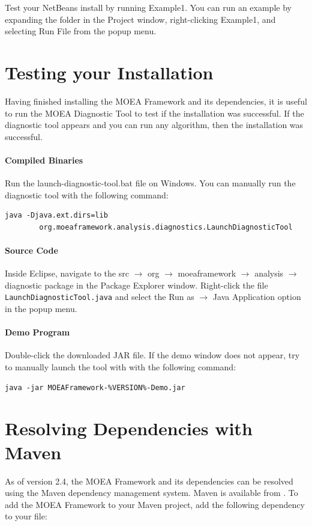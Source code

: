 Test your NetBeans install by running Example1.  You can run an example by expanding the  folder in the Project window, right-clicking Example1, and selecting Run File from the popup menu.

\section{Testing your Installation}
Having finished installing the MOEA Framework and its dependencies, it is useful to run the MOEA Diagnostic Tool to test if the installation was successful.  If the diagnostic tool appears and you can run any algorithm, then the installation was successful.

\paragraph{Compiled Binaries}
Run the launch-diagnostic-tool.bat file on Windows.  You can manually run the diagnostic tool with the following command:

\begin{lstlisting}[language=Plaintext]
java -Djava.ext.dirs=lib
		org.moeaframework.analysis.diagnostics.LaunchDiagnosticTool
\end{lstlisting}

\paragraph{Source Code}
Inside Eclipse, navigate to the src $\rightarrow$ org $\rightarrow$ moeaframework $\rightarrow$ analysis $\rightarrow$ diagnostic package in the Package Explorer window.  Right-click the file \texttt{LaunchDiagnosticTool.java} and select the Run as $\rightarrow$ Java Application option in the popup menu.

\paragraph{Demo Program}
Double-click the downloaded JAR file.  If the demo window does not appear, try to manually launch the tool with with the following command:

\begin{lstlisting}[language=Plaintext]
java -jar MOEAFramework-%VERSION%-Demo.jar
\end{lstlisting}

\section{Resolving Dependencies with Maven}
As of version 2.4, the MOEA Framework and its dependencies can be resolved using the Maven dependency management system.  Maven is available from .  To add the MOEA Framework to your Maven project, add the following dependency to your  file:

